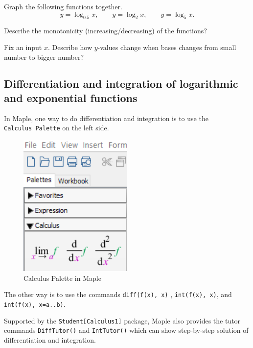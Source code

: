\documentclass[
  en,11pt,simple]{elegantbook}
\newcommand{\size}[2]{{\fontsize{#1}{0}\selectfont#2}}
\renewenvironment{exercise}[1][]{
    \refstepcounter{exer}
    \par\noindent
    \makebox[-3pt][r]{\color{red!90}\size{12}{\HandPencilLeft}}
	\textbf{\color{main}{\exercisename} \theexer #1}
    \rmfamily
}{\par\ignorespacesafterend}
\begin{document}
\begin{exercise}

Graph the following functions together.
\[
y=\log_{0.5}x, \qquad y=\log_2x, \qquad y=\log_{5}x.
\]

Describe the monotonicity (increasing/decreasing) of the functions?

Fix an input \(x\). Describe how \(y\)-values change when bases changes from small number to bigger number?
\end{exercise}

\hypertarget{differentiation-and-integration-of-logarithmic-and-exponential-functions}{%
\subsection{Differentiation and integration of logarithmic and exponential functions}\label{differentiation-and-integration-of-logarithmic-and-exponential-functions}}

In Maple, one way to do differentiation and integration is to use the \texttt{Calculus\ Palette} on the left side.

\begin{figure}
\centering
\includegraphics[width=0.5\textwidth,height=\textheight]{figs/Calculus-Palette.png}
\caption{Calculus Palette in Maple}
\end{figure}

The other way is to use the commands \texttt{diff(f(x),\ x)} , \texttt{int(f(x),\ x)}, and \texttt{int(f(x),\ x=a..b)}.

Supported by the \texttt{Student{[}Calculus1{]}} package, Maple also provides the tutor commands \texttt{DiffTutor()} and \texttt{IntTutor()} which can show step-by-step solution of differentiation and integration.
\end{document}
